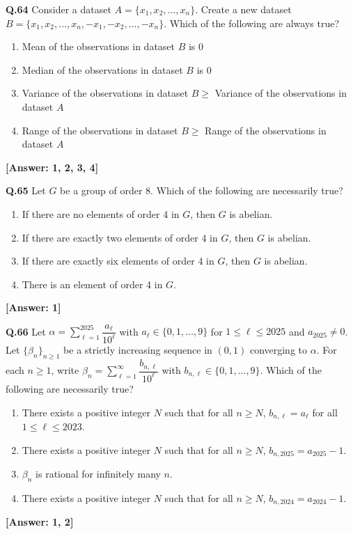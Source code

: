 \documentclass[12pt,a4paper]{article}
\newcommand{\ans}[1]{\quad\textcolor{anscolor}{\textbf{[Answer: #1]}}}
\begin{document}
\textbf{Q.64} Consider a dataset $A=\{x_1,x_2,\ldots,x_n\}$. Create a new dataset $B=\{x_1,x_2,\ldots,x_n,-x_1,-x_2,\ldots,-x_n\}$. Which of the following are always true?
\begin{enumerate}[label=\arabic*.]
\item Mean of the observations in dataset $B$ is 0
\item Median of the observations in dataset $B$ is 0
\item Variance of the observations in dataset $B\ge$ Variance of the observations in dataset $A$
\item Range of the observations in dataset $B\ge$ Range of the observations in dataset $A$
\end{enumerate}\ans{1, 2, 3, 4}

\textbf{Q.65} Let $G$ be a group of order 8. Which of the following are necessarily true?
\begin{enumerate}[label=\arabic*.]
\item If there are no elements of order 4 in $G$, then $G$ is abelian.
\item If there are exactly two elements of order 4 in $G$, then $G$ is abelian.
\item If there are exactly six elements of order 4 in $G$, then $G$ is abelian.
\item There is an element of order 4 in $G$.
\end{enumerate}\ans{1}

\textbf{Q.66} Let $\alpha=\displaystyle\sum_{\ell=1}^{2025}\dfrac{a_\ell}{10^\ell}$ with $a_\ell\in\{0,1,\ldots,9\}$ for $1\le\ell\le2025$ and $a_{2025}\neq0$. Let $\{\beta_n\}_{n\ge1}$ be a strictly increasing sequence in $(0,1)$ converging to $\alpha$. For each $n\ge1$, write $\beta_n=\sum_{\ell=1}^\infty\dfrac{b_{n,\ell}}{10^\ell}$ with $b_{n,\ell}\in\{0,1,\ldots,9\}$. Which of the following are necessarily true?
\begin{enumerate}[label=\arabic*.]
\item There exists a positive integer $N$ such that for all $n\ge N$, $b_{n,\ell}=a_\ell$ for all $1\le\ell\le2023$.
\item There exists a positive integer $N$ such that for all $n\ge N$, $b_{n,2025}=a_{2025}-1$.
\item $\beta_n$ is rational for infinitely many $n$.
\item There exists a positive integer $N$ such that for all $n\ge N$, $b_{n,2024}=a_{2024}-1$.
\end{enumerate}\ans{1, 2}
\end{document}
